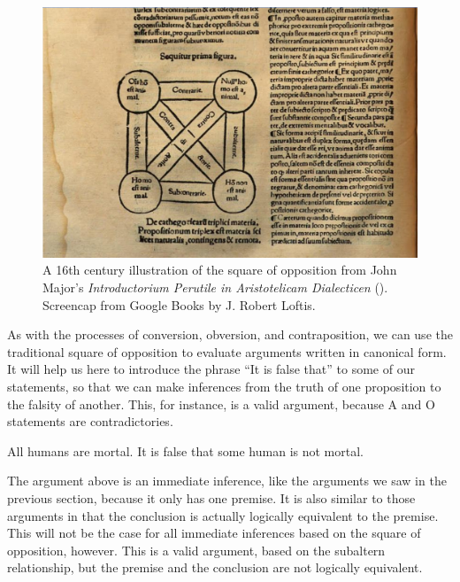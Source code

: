 \begin{figure}
\begin{mdframed}[style=mytableclearbox]
\begin{center}
\includegraphics*[scale=.5]{img/majorvenn2}
\end{center}
\end{mdframed}
\caption{A 16th century illustration of the square of opposition from John Major's \textit{Introductorium Perutile in Aristotelicam Dialecticen} (\cite*[fol.L]{Major1527}). Screencap from Google Books by J.  Robert Loftis.}
\label{fig:majorsquare}
\end{figure}

As with the processes of conversion, obversion, and contraposition, we can use the traditional square of opposition to evaluate arguments written in canonical form. It will help us here to introduce the phrase ``It is false that'' to some of our statements, so that we can make inferences from the truth of one proposition to the falsity of another. This, for instance, is a valid argument, because A and O statements are contradictories.


\begin{earg*}
\item All humans are mortal.
\itemc[.45] It is false that some human is not mortal.
\end{earg*}

The argument above is an immediate inference, like the arguments we saw in the previous section, because it only has one premise. It is also similar to those arguments in that the conclusion is actually logically equivalent to the premise. This will not be the case for all immediate inferences based on the square of opposition, however. This is a valid argument, based on the subaltern relationship, but the premise and the conclusion are not logically equivalent.

